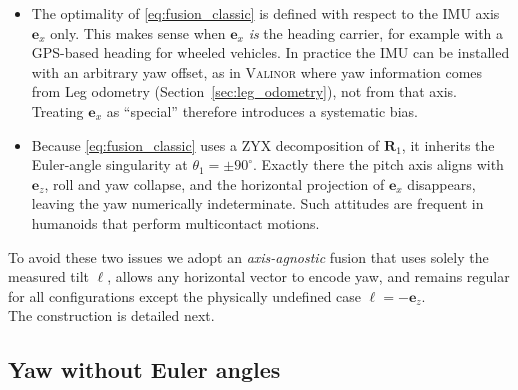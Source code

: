 \documentclass{IJCAS}
\begin{document}
\begin{itemize}[leftmargin=0pt]
\item The optimality of \eqref{eq:fusion_classic} is defined with
      respect to the IMU axis $\boldsymbol{e}_{x}$ only.  
      This makes sense when $\boldsymbol{e}_{x}$ \emph{is} the heading
      carrier, for example with a GPS-based heading for wheeled vehicles.  
      In practice the IMU can be installed with an arbitrary yaw
      offset, as in {\scshape{Valinor}} where yaw information comes from Leg odometry
      (Section~\ref{sec:leg_odometry}), not from
      that axis.  Treating $\boldsymbol{e}_{x}$ as ``special'' therefore
      introduces a systematic bias.

\item Because \eqref{eq:fusion_classic} uses a ZYX decomposition of
      $\boldsymbol{R}_{1}$, it inherits the Euler-angle singularity at
      $\theta_{1}= \pm 90^{\circ}$.  
      Exactly there the pitch axis aligns with
      $\boldsymbol{e}_{z}$, roll and yaw collapse, and the horizontal
      projection of $\boldsymbol{e}_{x}$ disappears, leaving the yaw
      numerically indeterminate.  
      Such attitudes are frequent in humanoids that perform
      multicontact motions.
\end{itemize}
To avoid these two issues we adopt an \emph{axis-agnostic} fusion that
uses solely the measured tilt $\boldsymbol{\ell}$, allows any horizontal
vector to encode yaw, and remains regular for all configurations except
the physically undefined case $\boldsymbol{\ell}=-\boldsymbol{e}_{z}$.\\
The construction is detailed next.

\subsection{Yaw without Euler angles}
\label{sec:yaw_no_euler}
\end{document}
